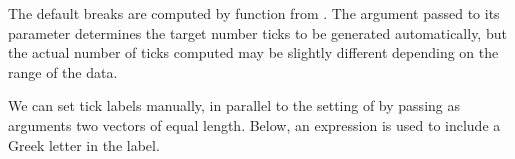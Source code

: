 \documentclass[krantz2]{krantz}\usepackage{knitr}
\begin{document}
\begin{knitrout}\footnotesize
{}\color{fgcolor}\begin{kframe}
\begin{alltt}
 \hlkwb{<-}
  \hlstd{(}   \hlstd{=} \hlstd{(}    \hlopt{+}
  \hlstd{()}
\end{alltt}
\end{kframe}
\end{knitrout}

\begin{knitrout}\footnotesize
{}\color{fgcolor}\begin{kframe}
\begin{alltt}
 \hlopt{+} \hlstd{(} \hlstd{=} \hlstd{(} \hlopt{*} \hlstd{,} \hlstd{,} \hlstd{))}
\end{alltt}
\end{kframe}
\end{knitrout}

The default breaks are computed by function  from . The argument passed to its parameter  determines the target number ticks to be generated automatically, but the actual number of ticks computed may be slightly different depending on the range of the data.

\begin{knitrout}\footnotesize
{}\color{fgcolor}\begin{kframe}
\begin{alltt}
 \hlkwb{<-}
   \hlopt{+} \hlstd{(} \hlstd{=} \hlstd{(} \hlstd{=} \hlstd{))}
\end{alltt}
\end{kframe}
\end{knitrout}

We can set tick labels manually, in parallel to the setting of  by passing as arguments two vectors of equal length. Below, an expression is used to include a Greek letter in the label.

\begin{knitrout}\footnotesize
{}\color{fgcolor}\begin{kframe}
\begin{alltt}
 \hlkwb{<-}
   \hlopt{+}
  \hlstd{(} \hlstd{=} \hlstd{(} \hlopt{*} \hlstd{,} \hlstd{,} \hlstd{),}
                      \hlstd{=} \hlstd{(}\hlstd{,} \hlstd{(}\hlopt{*} \hlstd{,} \hlstd{))}
\end{alltt}
\end{kframe}
\end{knitrout}
\end{document}
